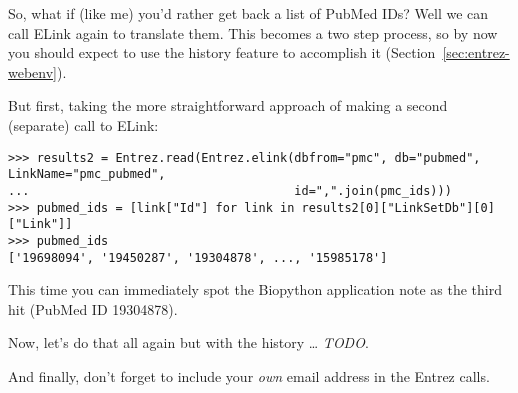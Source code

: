 So, what if (like me) you'd rather get back a list of PubMed IDs? Well we
can call ELink again to translate them. This becomes a two step process,
so by now you should expect to use the history feature to accomplish it
(Section~\ref{sec:entrez-webenv}).

But first, taking the more straightforward approach of making a second
(separate) call to ELink:

\begin{verbatim}
>>> results2 = Entrez.read(Entrez.elink(dbfrom="pmc", db="pubmed", LinkName="pmc_pubmed",
...                                     id=",".join(pmc_ids)))
>>> pubmed_ids = [link["Id"] for link in results2[0]["LinkSetDb"][0]["Link"]]
>>> pubmed_ids
['19698094', '19450287', '19304878', ..., '15985178']
\end{verbatim}

\noindent This time you can immediately spot the Biopython application note
as the third hit (PubMed ID 19304878).

Now, let's do that all again but with the history \ldots
\textit{TODO}.

And finally, don't forget to include your \emph{own} email address in the Entrez calls.
